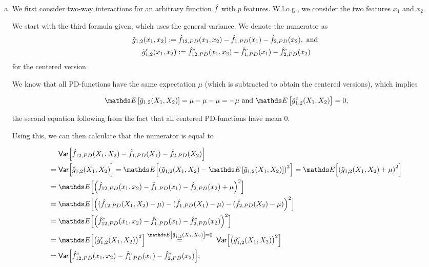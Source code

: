 {\begin{enumerate}[a)]
hence $H_{1,2} = \sqrt{ \tfrac{1}{26} } \approx 0.196$.

\item

We first consider two-way interactions for an arbitrary function $\hat{f}$ with $p$ features.
W.l.o.g., we consider the two features $x_1$ and $x_2$.

We start with the third formula given, which uses the general variance.
We denote the numerator as
\begin{gather*}
\tilde{g}_{1,2}(x_1, x_2) := \hat{f}_{12,PD}(x_1, x_2) -
    \hat{f}_{1,PD}(x_1) -
    \hat{f}_{2,PD}(x_2), \text{ and }\\
\tilde{g}^c_{1,2}(x_1, x_2) := \hat{f}^c_{12,PD}(x_1, x_2) -
    \hat{f}^c_{1,PD}(x_1) -
    \hat{f}^c_{2,PD}(x_2)
\end{gather*}
for the centered version.

We know that all PD-functions have the same expectation $\mu$ (which is subtracted to obtain the centered versions), which implies

$$
\E \left[ \tilde{g}_{1,2}(X_1, X_2) \right] = \mu - \mu - \mu = - \mu \text{ and }
\E \left[ \tilde{g}^c_{1,2}(X_1, X_2) \right] = 0,
$$

the second equation following from the fact that all centered PD-functions have mean 0.

Using this, we can then calculate that the numerator is equal to

\begin{align*}
& \; \var \Bigl[
    \fh_{12,PD}(X_1, X_2)-
    \fh_{1,PD}(X_1)-
    \fh_{2,PD}(X_2)
    \Bigr] \\
= & \; \var \Bigl[ \tilde{g}_{1,2}(X_1, X_2) \Bigr] 
= \E \Bigl[ \left( \tilde{g}_{1,2}(X_1, X_2) - \E \left[ \tilde{g}_{1,2}(X_1, X_2) \right] \right)^2 \Bigr]
= \E \Bigl[ \left( \tilde{g}_{1,2}(X_1, X_2) + \mu \right)^2 \Bigr] \\
= & \; \E \Bigl[ \left( \fh_{12,PD}(x_1, x_2) -
    \fh_{1,PD}(x_1) -
    \fh_{2,PD}(x_2) + \mu \right)^2 \Bigr] \\
= & \; \E \Bigl[ \left( ( \fh_{12,PD}(X_1, X_2) - \mu)
    - ( \fh_{1,PD}(X_1) - \mu)
    - ( \fh_{2,PD}(X_2) - \mu) \right)^2 \Bigr] \\
= & \; \E \Bigl[ \left( \fh^c_{12,PD}(x_1, x_2) -
    \fh^c_{1,PD}(x_1) -
    \fh^c_{2,PD}(x_2) \right)^2 \Bigr] \\
= & \; \E \Bigl[ \left( \tilde{g}^c_{1,2}(X_1, X_2) \right)^2 \Bigr]
\overset{\E \left[ \tilde{g}^c_{1,2}(X_1, X_2) \right] = 0}{=}
\; \var \Bigl[ \left( \tilde{g}^c_{1,2}(X_1, X_2) \right)^2 \Bigr] \\
= & \; \var \Bigl[ \fh^c_{12,PD}(x_1, x_2) -
    \fh^c_{1,PD}(x_1) -
    \fh^c_{2,PD}(x_2) \Bigr],
\end{align*}


\end{enumerate}}
